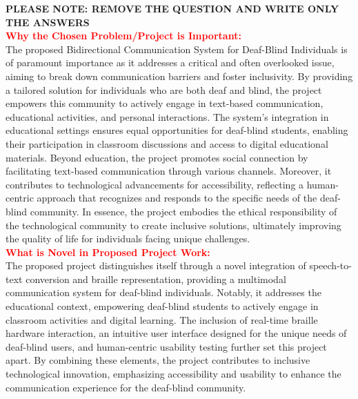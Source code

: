 \documentclass[12pt,a4paper]{report}
\begin{document}
\textbf{PLEASE NOTE: REMOVE THE QUESTION  AND WRITE ONLY THE ANSWERS \\}
\textbf{\textcolor{red}{Why the Chosen Problem/Project is Important:}} \\
The proposed Bidirectional Communication System for Deaf-Blind Individuals is of paramount importance as it addresses a critical and often overlooked issue, aiming to break down communication barriers and foster inclusivity. By providing a tailored solution for individuals who are both deaf and blind, the project empowers this community to actively engage in text-based communication, educational activities, and personal interactions. The system's integration in educational settings ensures equal opportunities for deaf-blind students, enabling their participation in classroom discussions and access to digital educational materials. Beyond education, the project promotes social connection by facilitating text-based communication through various channels. Moreover, it contributes to technological advancements for accessibility, reflecting a human-centric approach that recognizes and responds to the specific needs of the deaf-blind community. In essence, the project embodies the ethical responsibility of the technological community to create inclusive solutions, ultimately improving the quality of life for individuals facing unique challenges. \\



\noindent
\textbf{\textcolor{red}{What is Novel in Proposed Project Work:}} \\
 The proposed project distinguishes itself through a novel integration of speech-to-text conversion and braille representation, providing a multimodal communication system for deaf-blind individuals. Notably, it addresses the educational context, empowering deaf-blind students to actively engage in classroom activities and digital learning. The inclusion of real-time braille hardware interaction, an intuitive user interface designed for the unique needs of deaf-blind users, and human-centric usability testing further set this project apart. By combining these elements, the project contributes to inclusive technological innovation, emphasizing accessibility and usability to enhance the communication experience for the deaf-blind community. \\
\end{document}
